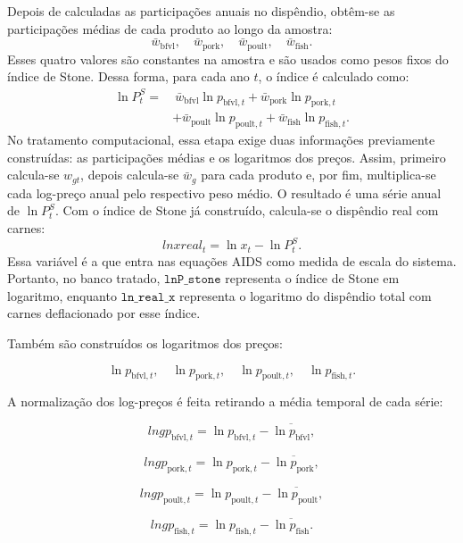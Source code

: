 \documentclass[12pt,a4paper]{article}
\begin{document}
Depois de calculadas as participações anuais no dispêndio, obtêm-se as participações médias de cada produto ao longo da amostra: \[ \bar{w}_{\text{bfvl}}, \quad \bar{w}_{\text{pork}}, \quad \bar{w}_{\text{poult}}, \quad \bar{w}_{\text{fish}}. \tag{30} \label{eq:wbar_base} \] Esses quatro valores são constantes na amostra e são usados como pesos fixos do índice de Stone. Dessa forma, para cada ano \(t\), o índice é calculado como: \[ \begin{aligned} \ln P_t^S =&\ \bar{w}_{\text{bfvl}}\ln p_{\text{bfvl},t} + \bar{w}_{\text{pork}}\ln p_{\text{pork},t} \\ &+ \bar{w}_{\text{poult}}\ln p_{\text{poult},t} + \bar{w}_{\text{fish}}\ln p_{\text{fish},t}. \end{aligned} \tag{31} \label{eq:stone_expandido} \] No tratamento computacional, essa etapa exige duas informações previamente construídas: as participações médias e os logaritmos dos preços. Assim, primeiro calcula-se \(w_{gt}\), depois calcula-se \(\bar{w}_g\) para cada produto e, por fim, multiplica-se cada log-preço anual pelo respectivo peso médio. O resultado é uma série anual de \(\ln P_t^S\). Com o índice de Stone já construído, calcula-se o dispêndio real com carnes: \[ lnxreal_t = \ln x_t - \ln P_t^S. \tag{32} \label{eq:lnxreal} \] Essa variável é a que entra nas equações AIDS como medida de escala do sistema. Portanto, no banco tratado, \(\texttt{lnP\_stone}\) representa o índice de Stone em logaritmo, enquanto \(\texttt{ln\_real\_x}\) representa o logaritmo do dispêndio total com carnes deflacionado por esse índice.

Também são construídos os logaritmos dos preços:

\[
\ln p_{\text{bfvl},t},
\quad
\ln p_{\text{pork},t},
\quad
\ln p_{\text{poult},t},
\quad
\ln p_{\text{fish},t}.
\tag{33}
\label{eq:log_precos}
\]

A normalização dos log-preços é feita retirando a média temporal de cada série:

\[
lngp_{\text{bfvl},t}
=
\ln p_{\text{bfvl},t}
-
\overline{\ln p_{\text{bfvl}}},
\tag{34}
\label{eq:lngp_bfvl}
\]

\[
lngp_{\text{pork},t}
=
\ln p_{\text{pork},t}
-
\overline{\ln p_{\text{pork}}},
\tag{35}
\label{eq:lngp_pork}
\]

\[
lngp_{\text{poult},t}
=
\ln p_{\text{poult},t}
-
\overline{\ln p_{\text{poult}}},
\tag{36}
\label{eq:lngp_poult}
\]

\[
lngp_{\text{fish},t}
=
\ln p_{\text{fish},t}
-
\overline{\ln p_{\text{fish}}}.
\tag{37}
\label{eq:lngp_fish}
\]
\end{document}
